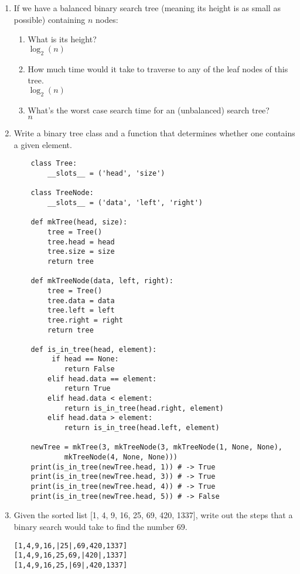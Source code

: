 \documentclass[11pt]{article}
\newenvironment{answer}{\large\lstset{basicstyle=\tiny\ttfamily}\color{white}}{}
\newenvironment{answer}{\large\lstset{basicstyle=\large\ttfamily}\color{red}}{}
\begin{document}
\begin{enumerate}
\item If we have a balanced binary search tree (meaning its height is as small as
    possible) containing $n$ nodes:
        \begin{enumerate}
            \item What is its height? \\
                \begin{answer}
                $\log_2(n)$
                \end{answer}
            \item How much time would it take to traverse to any of the leaf
            nodes of this tree. \\
                \begin{answer}
                $\log_2(n)$
                \end{answer}
            \item What's the worst case search time for an (unbalanced) search
            tree? \\
                \begin{answer}
                $n$
                \end{answer}
        \end{enumerate}
\pagebreak
\item Write a binary tree class and a function that determines whether one contains a given element.
		\begin{answer}
		\begin{lstlisting}
	class Tree:
		__slots__ = ('head', 'size')

	class TreeNode:
		__slots__ = ('data', 'left', 'right')

	def mkTree(head, size):
		tree = Tree()
		tree.head = head
		tree.size = size
		return tree

	def mkTreeNode(data, left, right):
		tree = Tree()
		tree.data = data
		tree.left = left
		tree.right = right
		return tree

	def is_in_tree(head, element):
		 if head == None:
			return False
		elif head.data == element:
			return True
		elif head.data < element:
			return is_in_tree(head.right, element)
		elif head.data > element:
			return is_in_tree(head.left, element)

	newTree = mkTree(3, mkTreeNode(3, mkTreeNode(1, None, None),
			mkTreeNode(4, None, None)))
	print(is_in_tree(newTree.head, 1)) # -> True
	print(is_in_tree(newTree.head, 3)) # -> True
	print(is_in_tree(newTree.head, 4)) # -> True
	print(is_in_tree(newTree.head, 5)) # -> False
		\end{lstlisting}
		\end{answer}

\item Given the sorted list [1, 4, 9, 16, 25, 69, 420, 1337], write out the steps that a binary search would take to find the number 69.
\begin{answer}
\begin{lstlisting}
[1,4,9,16,|25|,69,420,1337]
[1,4,9,16,25,69,|420|,1337]
[1,4,9,16,25,|69|,420,1337]
\end{lstlisting}
\end{answer}

\end{enumerate}
\end{document}

